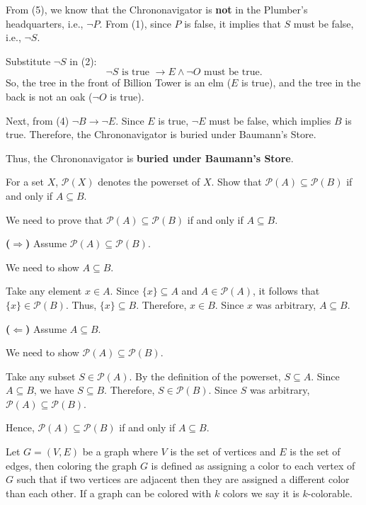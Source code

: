 \documentclass[a4paper]{exam}
\begin{document}
\begin{questions}
\begin{solution}
From (5), we know that the Chrononavigator is \textbf{not} in the Plumber's headquarters, i.e., $\neg P$. From (1), since $P$ is false, it implies that $S$ must be false, i.e., $\neg S$.

Substitute $\neg S$ in (2):
\[
\neg S \text{ is true } \rightarrow E \wedge \neg O \text{ must be true.}
\]
So, the tree in the front of Billion Tower is an elm ($E$ is true), and the tree in the back is not an oak ($\neg O$ is true).

Next, from (4) $\neg B \rightarrow \neg E$. Since $E$ is true, $\neg E$ must be false, which implies $B$ is true. Therefore, the Chrononavigator is buried under Baumann's Store.

Thus, the Chrononavigator is \textbf{buried under Baumann's Store}.
\end{solution}


For a set $X$, $\mathcal{P}(X)$ denotes the powerset of $X$.
Show that $ \mathcal{P}(A) \subseteq \mathcal {P}(B)$ if and only if $ A \subseteq B$.

\begin{solution}
We need to prove that $ \mathcal{P}(A) \subseteq \mathcal{P}(B)$ if and only if $A \subseteq B$.

\textbf{($\Rightarrow$)} Assume $ \mathcal{P}(A) \subseteq \mathcal{P}(B)$. 

We need to show $A \subseteq B$.

Take any element $x \in A$. Since $\{x\} \subseteq A$ and $A \in \mathcal{P}(A)$, it follows that $\{x\} \in \mathcal{P}(B)$. Thus, $\{x\} \subseteq B$. Therefore, $x \in B$. Since $x$ was arbitrary, $A \subseteq B$.

\textbf{($\Leftarrow$)} Assume $A \subseteq B$. 

We need to show $ \mathcal{P}(A) \subseteq \mathcal{P}(B)$.

Take any subset $S \in \mathcal{P}(A)$. By the definition of the powerset, $S \subseteq A$. Since $A \subseteq B$, we have $S \subseteq B$. Therefore, $S \in \mathcal{P}(B)$. Since $S$ was arbitrary, $ \mathcal{P}(A) \subseteq \mathcal{P}(B)$.

Hence, $ \mathcal{P}(A) \subseteq \mathcal{P}(B)$ if and only if $A \subseteq B$.
\end{solution}


Let $G = (V, E)$ be a graph where $V$ is the set of vertices and $E$ is the set of edges, then
coloring the graph $G$ is defined as assigning a color to each vertex of $G$ such that if two vertices are adjacent then they are assigned a different color than each other. 
If a graph can be colored with $k$ colors we say it is $k$-colorable.


\end{questions}
\end{document}
